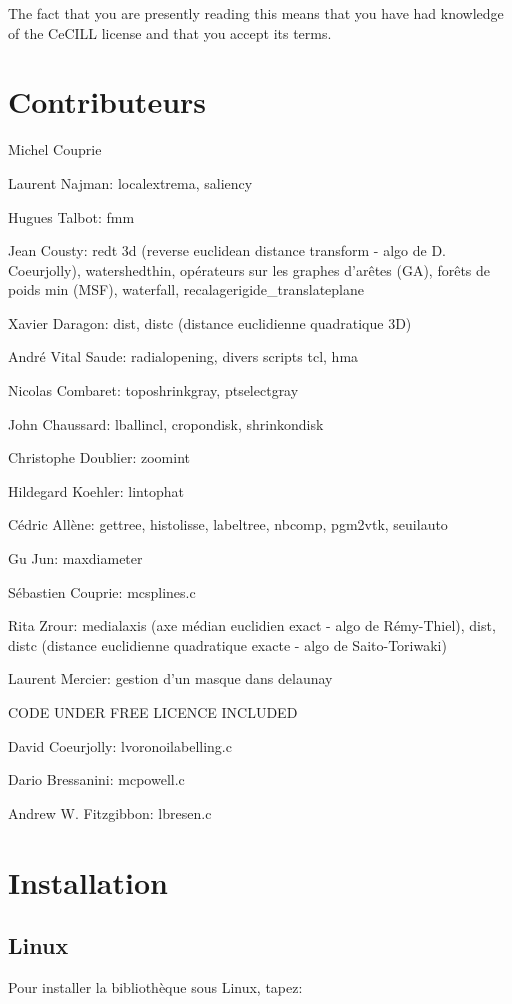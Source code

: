 The fact that you are presently reading this means that you have had knowledge of the Ce\-CILL license and that you accept its terms.\section{Contributeurs}\label{index_contributors}
Michel Couprie\par
 Laurent Najman: localextrema, saliency\par
 Hugues Talbot: fmm \par
 Jean Cousty: redt 3d (reverse euclidean distance transform - algo de D. Coeurjolly), watershedthin, op\'{e}rateurs sur les graphes d'ar\^{e}tes (GA), for\^{e}ts de poids min (MSF), waterfall, recalagerigide\_\-translateplane\par
 Xavier Daragon: dist, distc (distance euclidienne quadratique 3D)\par
 Andr\'{e} Vital Saude: radialopening, divers scripts tcl, hma\par
 Nicolas Combaret: toposhrinkgray, ptselectgray\par
 John Chaussard: lballincl, cropondisk, shrinkondisk\par
 Christophe Doublier: zoomint\par
 Hildegard Koehler: lintophat\par
 C\'{e}dric All\`{e}ne: gettree, histolisse, labeltree, nbcomp, pgm2vtk, seuilauto\par
 Gu Jun: maxdiameter\par
 S\'{e}bastien Couprie: mcsplines.c\par
 Rita Zrour: medialaxis (axe m\'{e}dian euclidien exact - algo de R\'{e}my-Thiel), dist, distc (distance euclidienne quadratique exacte - algo de Saito-Toriwaki)\par
 Laurent Mercier: gestion d'un masque dans delaunay\par


CODE UNDER FREE LICENCE INCLUDED

David Coeurjolly: lvoronoilabelling.c\par
 Dario Bressanini: mcpowell.c\par
 Andrew W. Fitzgibbon: lbresen.c\par
\section{Installation}\label{index_install}
\subsection{Linux}\label{index_linux}
Pour installer la biblioth\`{e}que sous Linux, tapez: 

